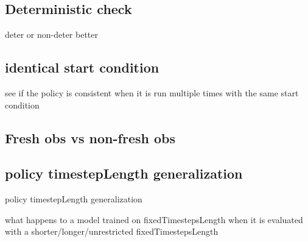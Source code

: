 \subsection{Deterministic check}

deter or non-deter better

\subsection{identical start condition}

see if the policy is consistent when it is run multiple times with the same start condition



\subsection{Fresh obs vs non-fresh obs}

 





\subsection{policy timestepLength generalization}

policy timestepLength generalization 

what happens to a model trained on fixedTimestepsLength when it is evaluated with a shorter/longer/unrestricted fixedTimestepsLength